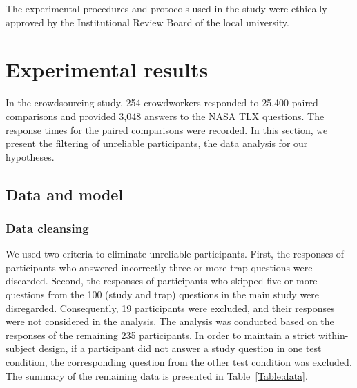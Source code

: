 \documentclass[a4paper,conference]{IEEEtran}
\begin{document}
The experimental procedures and protocols used in the study were ethically approved by the Institutional Review Board of the local university.%
 




\section{Experimental results}
In the crowdsourcing study, 254 crowdworkers responded to 25,400 paired comparisons and provided 3,048 answers to the NASA TLX questions. The response times for the paired comparisons were recorded. In this section, we present the filtering of unreliable participants, the data analysis for our hypotheses.%


\subsection{ Data and model}

\subsubsection{Data cleansing}
We used two criteria to eliminate unreliable participants. First, the responses of participants who answered incorrectly three or more trap questions were discarded. Second, the responses of participants who skipped five or more questions from the 100 (study and trap) questions in the main study were disregarded. Consequently, 19 participants were excluded, and their responses were not considered in the analysis. The analysis was conducted based on the responses of the remaining 235 participants.
In order to maintain a strict within-subject design, if a participant did not answer a study question in one test condition, the corresponding question from the other test condition was excluded. The summary of the remaining data is presented in Table~\ref{Table:data}.
\end{document}
